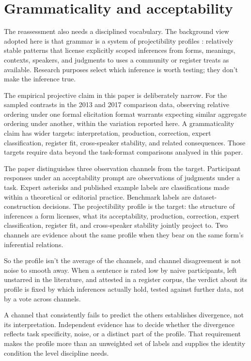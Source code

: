 \section{Grammaticality and acceptability}\label{sec:gramm-accept}

The reassessment also needs a disciplined vocabulary. The background view
adopted here is that grammar is a system of projectibility profiles
\citep{Goodman1955}: relatively stable patterns that license explicitly
scoped inferences from forms, meanings, contexts, speakers, and judgments to
uses a community or register treats as available. Research purposes select
which inference is worth testing; they don't make the inference true.

The empirical projective claim in this paper is deliberately narrow. For the
sampled contrasts in the 2013 and 2017 comparison data, observing relative
ordering under one formal elicitation format warrants expecting similar
aggregate ordering under another,
within the variation reported here. A grammaticality claim has wider targets:
interpretation, production, correction, expert classification, register fit,
cross-speaker stability, and related consequences. Those targets require data
beyond the task-format comparisons analysed in this paper.

The paper distinguishes three observation channels from the target. Participant
responses under an acceptability prompt are observations of judgments under a task. Expert
asterisks and published example labels are classifications made within a
theoretical or editorial practice. Benchmark labels are dataset-construction
decisions. The projectibility profile is the target: the structure of inferences
a form licenses, what its acceptability, production, correction, expert
classification, register fit, and cross-speaker stability jointly project to. Two
channels are evidence about the same profile when they bear on the same form's
inferential relations.

So the profile isn't the average of the channels, and channel disagreement is
not noise to smooth away. When a sentence is rated low by naive participants,
left unstarred in the literature, and attested in a register corpus, the verdict
about its profile is fixed by which inferences actually hold, tested against
further data, not by a vote across channels.

A channel that consistently fails to predict the others establishes divergence,
not its interpretation. Independent evidence has to decide whether the divergence
reflects task specificity, noise, or a distinct part of the profile. That
requirement makes the profile more than an unweighted set of labels and supplies the identity
condition the level discipline needs.

